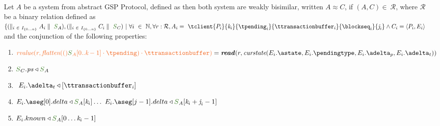 \documentclass[envcountsect,runningheads,orivec]{llncs}
\begin{document}
\begin{theorem}
Let $A$ be a system from abstract GSP Protocol, defined as  then both system are weakly bisimilar, written $A \approx C$, if $(A,C)  \in \ \mathcal{R}$, where $\mathcal{R}$ be a binary relation defined as $\{ (\parallel_{i \ \in\ I_{\{0 \ldots n\}}} A_i \parallel \ \queuemessage_A),(\parallel_{i \ \in\ I_{\{0 \ldots n\}}} C_i \parallel \ \queuemessage_C) \ | \ \forall i \ \in\ \mathbb{N}, \forall r: \readtype, A_i = \ \tclient{\tprogram_i}{\tknown_i}{\tpending_i}{\ttransactionbuffer_i}{\tsent_i}{\treceivebuffer_i} \land C_i = \client{P_i}{\stateclient_i}$ and the conjunction of the following properties: %
{}
\begin{enumerate}
	\item $\rvalue{r}{\flatten(\queuemessage_{A}[0..\tknown-1] \cdot \tpending) \cdot \ttransactionbuffer} = \readp{r}{\curstate{E_{i}.\known}{E_{i}.\pending}{E_{i}.\pushbuffer}{E_{i}.\transactionbuffer}}$
	\item $\queuemessage_C.\state \triangleleft \queuemessage_A$
	\item $\ E_{i}.\transactionbuffer \triangleleft [\ttransactionbuffer_i]$
	\item $E_{i}.\receivebuffer[0].delta \triangleleft \queuemessage_A[\tknown_i] \ldots\ E_{i}.\receivebuffer[j - 1].delta \triangleleft \queuemessage_A[\tknown_i + \treceivebuffer_i - 1]$
	\item $E_{i}.known \triangleleft \queuemessage_A[0 \ldots \tknown_i - 1]$

\end{enumerate}
\end{theorem}
\end{document}
